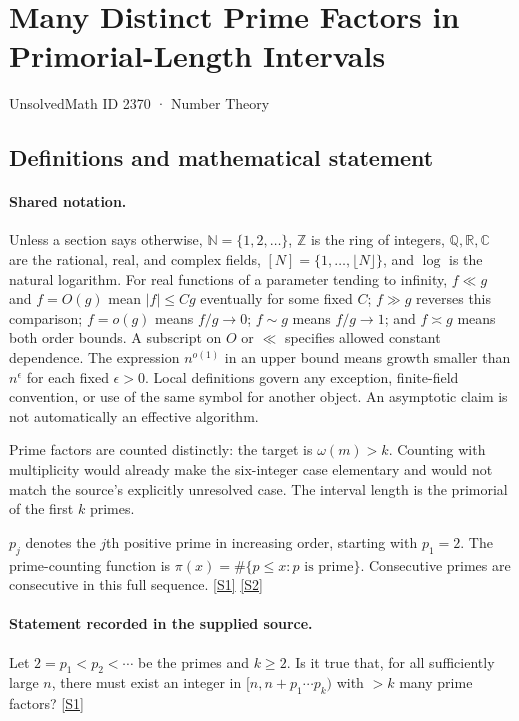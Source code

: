\documentclass[11pt,a4paper]{article}
\newcommand{\N}{\mathbb{N}}
\newcommand{\Z}{\mathbb{Z}}
\newcommand{\Q}{\mathbb{Q}}
\newcommand{\R}{\mathbb{R}}
\newcommand{\C}{\mathbb{C}}
\newcommand{\sref}[2]{\hyperlink{source:#1:#2}{[S#2]}}
\begin{document}

\setcounter{section}{2369}

\section{Many Distinct Prime Factors in Primorial-Length Intervals}\label{2370}

{\small\sffamily UnsolvedMath ID 2370 · Number Theory}

\subsection{Definitions and mathematical statement}

\paragraph{Shared notation.}Unless a section says otherwise, $\N=\{1,2,\ldots\}$,
$\Z$ is the ring of integers, $\Q,\R,\C$ are the rational, real, and complex
fields, $[N]=\{1,\ldots,\lfloor N\rfloor\}$, and $\log$ is the natural
logarithm. For real functions of a parameter tending to infinity,
$f\ll g$ and $f=O(g)$ mean $|f|\leq Cg$ eventually for some fixed $C$;
$f\gg g$ reverses this comparison; $f=o(g)$ means $f/g\to0$;
$f\sim g$ means $f/g\to1$; and $f\asymp g$ means both order bounds.
A subscript on $O$ or $\ll$ specifies allowed constant dependence.
The expression $n^{o(1)}$ in an upper bound means growth smaller than
$n^\epsilon$ for each fixed $\epsilon>0$. Local definitions govern any
exception, finite-field convention, or use of the same symbol for another
object. An asymptotic claim is not automatically an effective algorithm.



Prime factors are counted distinctly: the target is $\omega(m)>k$. Counting with multiplicity would already make the six-integer case elementary and would not match the source's explicitly unresolved case. The interval length is the primorial of the first $k$ primes.

$p_j$ denotes the $j$th positive prime in increasing order, starting with $p_1=2$. The prime-counting function is $\pi(x)=\#\{p\leq x:p\text{ is prime}\}$. Consecutive primes are consecutive in this full sequence. \sref{2370}{1} \sref{2370}{2}

\paragraph{Statement recorded in the supplied source.}
Let $2=p_1<p_2<\cdots$ be the primes and $k\geq 2$. Is it true that, for all sufficiently large $n$, there must exist an integer in $[n,n+p_1\cdots p_k)$ with $>k$ many prime factors? \sref{2370}{1}
\end{document}

